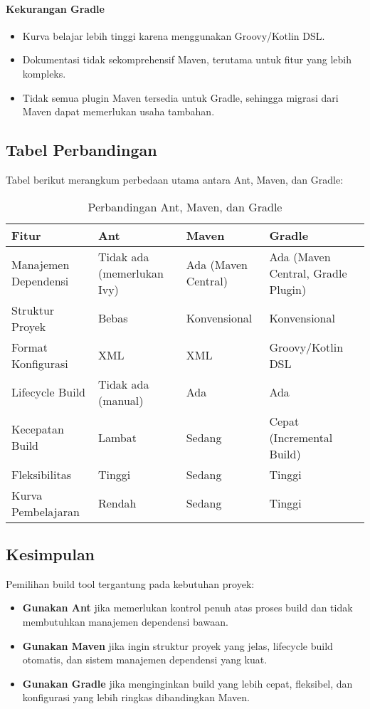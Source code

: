 \paragraph{Kekurangan Gradle}
\begin{itemize}
	\item Kurva belajar lebih tinggi karena menggunakan Groovy/Kotlin DSL.
	\item Dokumentasi tidak sekomprehensif Maven, terutama untuk fitur yang lebih kompleks.
	\item Tidak semua plugin Maven tersedia untuk Gradle, sehingga migrasi dari Maven dapat memerlukan usaha tambahan.
\end{itemize}

\subsection{Tabel Perbandingan}
Tabel berikut merangkum perbedaan utama antara Ant, Maven, dan Gradle:

\begin{table}[h]
	\centering
	\scriptsize
	\begin{tabular}{|p{}|p{}|p{}|p{}|}
		\hline
		\textbf{Fitur} & \textbf{Ant} & \textbf{Maven} & \textbf{Gradle} \\
		\hline
		Manajemen Dependensi & Tidak ada (memerlukan Ivy) & Ada (Maven Central) & Ada (Maven Central, Gradle Plugin) \\
		\hline
		Struktur Proyek & Bebas & Konvensional & Konvensional \\
		\hline
		Format Konfigurasi & XML & XML & Groovy/Kotlin DSL \\
		\hline
		Lifecycle Build & Tidak ada (manual) & Ada & Ada \\
		\hline
		Kecepatan Build & Lambat & Sedang & Cepat (Incremental Build) \\
		\hline
		Fleksibilitas & Tinggi & Sedang & Tinggi \\
		\hline
		Kurva Pembelajaran & Rendah & Sedang & Tinggi \\
		\hline
	\end{tabular}
	\caption{Perbandingan Ant, Maven, dan Gradle}
	\label{tab:comparison}
\end{table}

\subsection{Kesimpulan}
Pemilihan build tool tergantung pada kebutuhan proyek:
\begin{itemize}
	\item \textbf{Gunakan Ant} jika memerlukan kontrol penuh atas proses build dan tidak membutuhkan manajemen dependensi bawaan.
	\item \textbf{Gunakan Maven} jika ingin struktur proyek yang jelas, lifecycle build otomatis, dan sistem manajemen dependensi yang kuat.
	\item \textbf{Gunakan Gradle} jika menginginkan build yang lebih cepat, fleksibel, dan konfigurasi yang lebih ringkas dibandingkan Maven.
\end{itemize}

